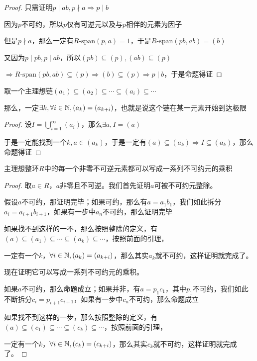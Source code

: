 \documentclass[12pt, a4paper, oneside, UTF8]{ctexbook}
\begin{document}
			\begin{proof}
				只需证明$p \mid ab,p \nmid a \Rightarrow p \mid b$
				
				因为$p$不可约，所以$p$仅有可逆元以及与$p$相伴的元素为因子
				
				但是$p \nmid a$，那么一定有$R\text{-span}(p,a)=1$，于是$R\text{-span}(pb,ab)=(b)$
				
				又因为$p \mid pb,p\mid ab$，所以$(pb)\subseteq (p),(ab)\subseteq (p)$
				
				$\Rightarrow R\text{-span}(pb,ab) \subseteq (p) \Rightarrow (b) \subseteq (p) \Rightarrow p \mid b$，于是命题得证
			\end{proof}
			\begin{lemma}{}{}
				取一个主理想链$(a_1)\subseteq (a_2) \subseteq \cdots \subseteq (a_i) \subseteq \cdots$
				
				那么，一定$\exists k,\forall i \in \mathbb{N},(a_k)=(a_{k+i})$，也就是说这个链在某一元素开始到达极限
			\end{lemma}
			\begin{proof}
				设$I = \bigcup_{i=1}^{\infty} (a_i)$，那么$\exists a ,I=(a)$
				
				于是一定能找到一个$k,a \in (a_k)$，于是一定有$(a) \subseteq (a_k) \Rightarrow I \subseteq (a_k)$，那么命题得证
			\end{proof}
			\begin{proposition}
				主理想整环$R$中的每一个非零不可逆元素都可以写成一系列不可约元的乘积
			\end{proposition}
			\begin{proof}
				取$a \in R$，$a$非零且不可逆。我们首先证明$a$可被不可约元整除。
				
				假设$a$不可约，那证明完毕；如果可约，那么有$a = a_1 b_1$，我们如此拆分$a_i = a_{i+1}b_{i+1}$，如果有一步中$a_{n}$不可约，那么证明完毕
				
				如果找不到这样的一不，那么按照整除的定义，有$(a) \subseteq (a_1) \subseteq \cdots \subseteq (a_k) \subseteq \cdots$，按照前面的引理，
				
				一定有一个$k$，$\forall i \in \mathbb{N},(a_k)=(a_{k+i})$，那么其实$a_k$就不可约，这样证明就完成了。
				
				现在证明它可以写成一系列不可约元的乘积。
				
				如果$a$不可约，那么命题成立；如果并非，有$a = p_1 c_1$，其中$p_1$不可约，我们如此不断拆分$c_i = p_{i+1}c_{i+1}$，如果有一步中$c_{n}$不可约，那么命题成立
				
				如果找不到这样的一步，那么按照整除的定义，有$(a) \subseteq (c_1) \subseteq \cdots \subseteq (c_k) \subseteq \cdots$，按照前面的引理，
				
				一定有一个$k$，$\forall i \in \mathbb{N},(c_k)=(c_{k+i})$，那么其实$c_k$就不可约，这样证明就完成了。
			\end{proof}
\end{document}
